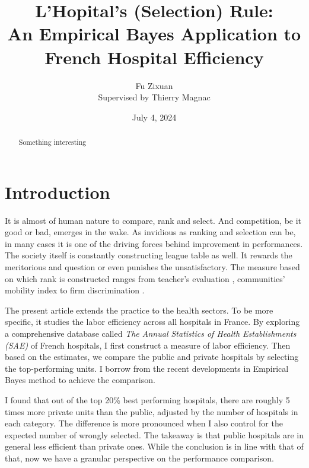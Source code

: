 \documentclass[12pt]{article}
\title{L'Hopital's (Selection) Rule:\\{\large {An Empirical Bayes Application to French Hospital Efficiency}}}
\author{Fu Zixuan \\{\small {Supervised by Thierry Magnac}}}
\date{July 4, 2024}
\begin{document}
\maketitle
\thispagestyle{empty}
\begin{abstract}
    \noindent  Something interesting\\


    \bigskip
\end{abstract}

\newpage
\thispagestyle{empty}
\tableofcontents
\newpage

\setcounter{page}{1}
\section{Introduction}

It is almost of human nature to compare, rank and select. And competition, be
it good or bad, emerges in the wake. As invidious as ranking and selection can
be, in many cases it is one of the driving forces behind improvement in
performances. The society itself is constantly constructing league table as
well. It rewards the meritorious and question or even punishes the
unsatisfactory. The measure based on which rank is constructed ranges from
teacher's evaluation \citep{chetty2014measuring}, communities' mobility index
\citep{chetty2018impacts} to firm discrimination \citep{kline2022systemic}.

The present article extends the practice to the health sectors. To be more
specific, it studies the labor efficiency across all hospitals in France. By
exploring a comprehensive database called \textit{The Annual Statistics of
    Health Establishments (SAE)} of French hospitals, I first construct a measure
of labor efficiency. Then based on the estimates, we compare the public and
private hospitals by selecting the top-performing units. I borrow from the
recent developments in Empirical Bayes method to achieve the comparison.

I found that out of the top 20\% best performing hospitals, there are roughly 5
times more private units than the public, adjusted by the number of hospitals
in each category. The difference is more pronounced when I also control for the
expected number of wrongly selected. The takeaway is that public hospitals are
in general less efficient than private ones. While the conclusion is in line
with that of \cite{croiset2024hospitals} that, now we have a granular
perspective on the performance comparison.
\end{document}
